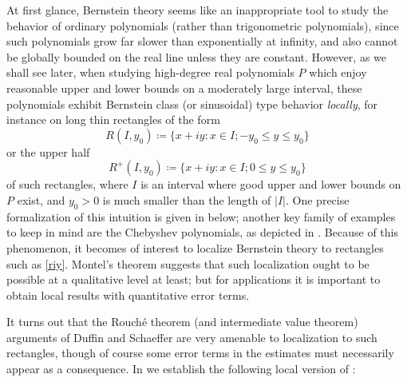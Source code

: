 \documentclass[12pt]{amsart}
\begin{document}
At first glance, Bernstein theory seems like an inappropriate tool to study the behavior of ordinary polynomials (rather than trigonometric polynomials), since such polynomials grow far slower than exponentially at infinity, and also cannot be globally bounded on the real line unless they are constant.  However, as we shall see later, when studying high-degree real polynomials $P$ which enjoy reasonable upper and lower bounds on a moderately large interval, these polynomials exhibit Bernstein class (or sinusoidal) type behavior \emph{locally}, for instance on long thin rectangles of the form
\begin{equation}\label{riy-0}
 R(I, y_0) \coloneqq \{ x+iy: x \in I; -y_0 \leq y \leq y_0 \}
\end{equation}
or the upper half
\begin{equation}\label{riy}
 R^+(I, y_0) \coloneqq \{ x+iy: x \in I; 0 \leq y \leq y_0 \}
\end{equation}
of such rectangles, where $I$ is an interval where good upper and lower bounds on $P$ exist, and $y_0>0$ is much smaller than the length of $|I|$.  One precise formalization of this intuition is given in  below; another key family of examples to keep in mind are the Chebyshev polynomials, as depicted in .  Because of this phenomenon, it becomes of interest to localize Bernstein theory to rectangles such as \eqref{riy}.  Montel's theorem suggests that such localization ought to be possible at a qualitative level at least; but for applications it is important to obtain local results with quantitative error terms.

It turns out that the Rouch\'e theorem (and intermediate value theorem) arguments of Duffin and Schaeffer are very amenable to localization to such rectangles, though of course some error terms in the estimates must necessarily appear as a consequence.  In  we establish the following local version of :
\end{document}
